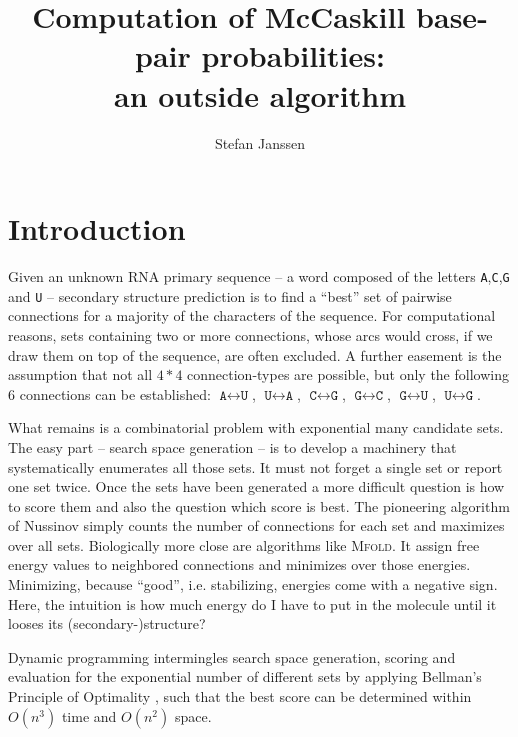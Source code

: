 \documentclass[paper=a4,fontsize=12pt]{scrartcl}
\title{Computation of McCaskill base-pair probabilities:\\ an outside algorithm}
\author{Stefan Janssen}
\newcommand{\progname}[1]{\mbox{\textsc{#1}}\xspace}
\def\mfold{\progname{Mfold}}
\begin{document}
\maketitle

\section{Introduction}\label{sec:introduction}
Given an unknown RNA primary sequence -- a word composed of the letters \texttt{A},\texttt{C},\texttt{G} and \texttt{U} -- secondary structure prediction is to find a ``best'' set of pairwise connections for a majority of the characters of the sequence. For computational reasons, sets containing two or more connections, whose arcs would cross, if we draw them on top of the sequence, are often excluded. A further easement is the assumption that not all $4*4$ connection-types are possible, but only the following $6$ connections can be established: $\texttt{A} \leftrightarrow \texttt{U}$, $\texttt{U} \leftrightarrow \texttt{A}$, $\texttt{C} \leftrightarrow \texttt{G}$, $\texttt{G} \leftrightarrow \texttt{C}$, $\texttt{G} \leftrightarrow \texttt{U}$, $\texttt{U} \leftrightarrow \texttt{G}$.

What remains is a combinatorial problem with exponential many candidate sets. The easy part -- search space generation -- is to develop a machinery that systematically enumerates all those sets. It must not forget a single set or report one set twice. Once the sets have been generated a more difficult question is how to score them and also the question which score is best. The pioneering algorithm of Nussinov \cite{NUS:PIE:GRI:KLE:1978} simply counts the number of connections for each set and maximizes over all sets. Biologically more close are algorithms like \mfold \cite{ZUK:STI:1981}. It assign free energy values to neighbored connections and minimizes over those energies. Minimizing, because ``good'', i.e. stabilizing, energies come with a negative sign. Here, the intuition is how much energy do I have to put in the molecule until it looses its (secondary-)structure?

Dynamic programming intermingles search space generation, scoring and evaluation for the exponential number of different sets by applying Bellman's Principle of Optimality \cite{BEL:1957}, such that the best score can be determined within $O(n^3)$ time and $O(n^2)$ space. %
\end{document}
